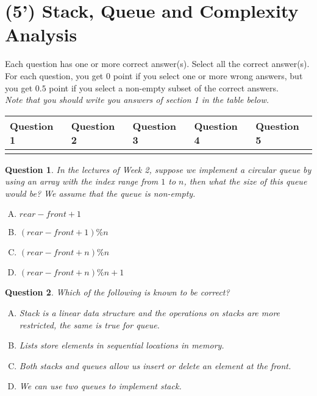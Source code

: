 \documentclass[11pt]{article}
\newtheorem{Q}{Question}
\begin{document}
\raggedright
\newcommand\NAME{Your Name:}  %
\newcommand\ANDREWID{Your ID:}     %
\newcommand\HWNUM{3}              %


\section{(5') Stack, Queue and Complexity Analysis}
Each question has one or more correct answer(s). Select all the correct answer(s). For each question, you get $0$ point if you select one or more wrong answers, but you get $0.5$ point if you select a non-empty subset of the correct answers.\\
\textit{Note that you should write you answers of section 1 in the table below.}
\begin{table}[htbp]
	\begin{tabular}{|p{2cm}|p{2cm}|p{2cm}|p{2cm}|p{2cm}|}
		\hline 
		Question 1 & Question 2 & Question 3 & Question 4 & Question 5  \\ 
		\hline 
		&  &  &  & \\ 
		\hline 
	\end{tabular} 
\end{table}
\begin{Q}
	In the lectures of Week 2, suppose we implement a circular queue by using an array with the index range from $1$ to $n$, then what the size of this queue would be? We assume that the queue is non-empty.
	\begin{enumerate}[(A)]
		\item $rear-front+1$
		\item $(rear-front+1)\%n$
		\item $(rear-front+n)\%n$
		\item $(rear-front+n)\%n+1$
	\end{enumerate}
\end{Q}


\begin{Q}
	Which of the following is known to be correct? 
	\begin{enumerate}[(A)]
		\item Stack is a linear data structure and the operations on stacks are more restricted, the same is true for queue.
		\item Lists store elements in sequential locations in memory.
		\item Both stacks and queues allow us insert or delete an element at the front.
		\item We can use two queues to implement stack.
	\end{enumerate}
\end{Q}
\end{document}
